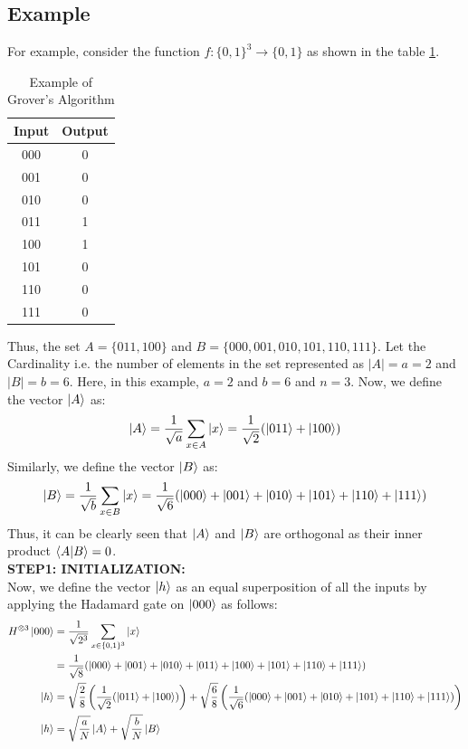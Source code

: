 \subsection{Example}
For example, consider the function $f:\{0,1\}^3 \rightarrow \{0,1\}$ as shown in the table \ref{tab:groverex1}.
\begin{table}[ht]
    \centering
    \begin{tabular}{|c|c|}
        \hline
        Input & Output \\
        \hline
        000 & 0 \\
        001 & 0 \\
        010 & 0 \\
        011 & 1 \\
        100 & 1 \\
        101 & 0 \\
        110 & 0 \\
        111 & 0 \\
        \hline
    \end{tabular}
    \caption{Example of Grover's Algorithm}
    \label{tab:groverex1}   
\end{table}
Thus, the set $A=\{011,100\}$ and $B=\{000,001,010,101,110,111\}$. Let the Cardinality i.e. the number of elements in the set represented as $|A|=a=2$ and $|B|=b=6$.
Here, in this example, $a=2$ and $b=6$ and $n=3$. Now, we define the vector $\ket{A}$ as:
\[
    \ket{A}=\frac{1}{\sqrt{a}}\sum_{x \in A}\ket{x}=\frac{1}{\sqrt{2}}(\ket{011}+\ket{100})
\]
Similarly, we define the vector $\ket{B}$ as:
\[
    \ket{B}=\frac{1}{\sqrt{b}}\sum_{x \in B}\ket{x}=\frac{1}{\sqrt{6}}(\ket{000}+\ket{001}+\ket{010}+\ket{101}+\ket{110}+\ket{111})
\]
Thus, it can be clearly seen that $\ket{A}$ and $\ket{B}$ are orthogonal as their inner product $\braket{A|B}=0$.\\
\textbf{STEP1: INITIALIZATION: }\\
Now, we define the vector $\ket{h}$ as an equal superposition of all the inputs by applying the Hadamard gate on  $\ket{000}$ as follows:
\begin{align*}
    H^{\otimes 3}\ket{000}&=\frac{1}{\sqrt{2^3}}\sum_{x \in \{0,1\}^3}\ket{x}\\
    &=\frac{1}{\sqrt{8}}(\ket{000}+\ket{001}+\ket{010}+\ket{011}+\ket{100}+\ket{101}+\ket{110}+\ket{111})\\
    \ket{h}&=\sqrt{\frac{2}{8}}\left(\frac{1}{\sqrt{2}}(\ket{011}+\ket{100})\right)+\sqrt{\frac{6}{8}}\left(\frac{1}{\sqrt{6}}(\ket{000}+\ket{001}+\ket{010}+\ket{101}+\ket{110}+\ket{111})\right)\\
    \ket{h}&=\sqrt{\frac{a}{N}}\ket{A}+\sqrt{\frac{b}{N}}\ket{B}
\end{align*}
